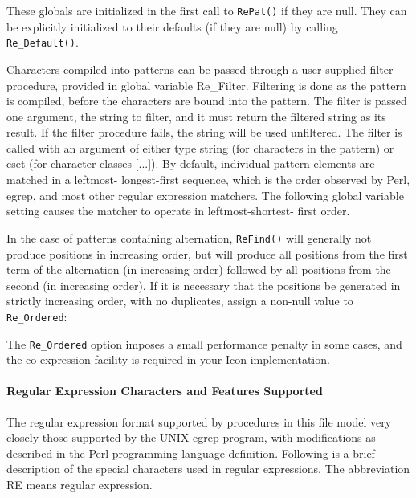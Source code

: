 These globals are initialized in the first call to \texttt{RePat()} if
they are null. They can be explicitly initialized to their defaults (if
they are null) by calling \texttt{Re\_Default()}.

Characters compiled into patterns can be passed through a user-supplied
filter procedure, provided in global variable \textsf{Re\_Filter}.
Filtering is done as the pattern is compiled, before the characters are
bound into the pattern. The filter is passed one argument, the string
to filter, and it must return the filtered string as its result. If the
filter procedure fails, the string will be used unfiltered. The filter
is called with an argument of either type string (for characters in the
pattern) or cset (for character classes [...]). By default, individual
pattern elements are matched in a {\textquotedbl}leftmost-
longest-first{\textquotedbl} sequence, which is the order observed by
Perl, egrep, and most other regular expression
matchers. The following global variable setting causes the matcher to
operate in leftmost-shortest- first order.


In the case of patterns containing alternation, \texttt{ReFind()} will
generally not produce positions in increasing order, but will produce
all positions from the first term of the alternation (in increasing
order) followed by all positions from the second (in increasing order).
If it is necessary that the positions be generated in strictly
increasing order, with no duplicates, assign a non-null value to
\texttt{Re\_Ordered}:


The \texttt{Re\_Ordered} option imposes a small performance penalty in
some cases, and the co-expression facility is required in your Icon
implementation.

\paragraph{Regular Expression Characters and Features Supported}
The regular expression format supported by procedures in this file model
very closely those supported by the UNIX
{\textquotedbl}egrep{\textquotedbl} program, with modifications as
described in the Perl programming language definition. Following is a
brief description of the special characters used in regular
expressions. The abbreviation RE means regular expression.

